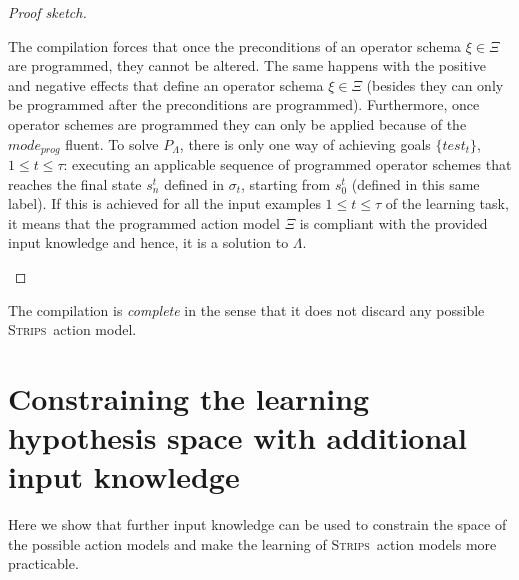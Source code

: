 \documentclass[letterpaper]{article} %
\newcommand{\strips}{\textsc{Strips}}     %
\begin{document}
\begin{proof}[Proof sketch]
\begin{small}
The compilation forces that once the preconditions of an operator schema $\xi \in \Xi$ are programmed, they cannot be altered. The same happens with the positive and negative effects that define an operator schema $\xi \in \Xi$ (besides they can only be programmed after the preconditions are programmed). Furthermore, once operator schemes are programmed they can only be applied because of the $mode_{prog}$ fluent. To solve $P_{\Lambda}$, there is only one way of achieving goals $\{test_t\}$, {\small $1\leq t\leq \tau$}: executing an applicable sequence of programmed operator schemes that reaches the final state $s_n^t$ defined in $\sigma_t$, starting from $s_0^t$ (defined in this same label). If this is achieved for all the input examples {\small $1\leq t\leq \tau$} of the learning task, it means that the programmed action model $\Xi$ is compliant with the provided input knowledge and hence, it is a solution to $\Lambda$.
\end{small}
\end{proof}

The compilation is {\em complete} in the sense that it does not discard any possible \strips\ action model.


\section{Constraining the learning hypothesis space with additional input knowledge}
\label{sec:Constraining}
Here we show that further input knowledge can be used to constrain the space of the possible action models and make the learning of \strips\ action models more practicable.
\end{document}
